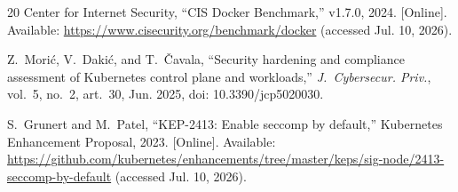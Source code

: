 \documentclass[conference]{IEEEtran}
\begin{document}
\begin{thebibliography}{20}
Center for Internet Security, ``CIS Docker Benchmark,'' v1.7.0, 2024. [Online]. Available: \url{https://www.cisecurity.org/benchmark/docker} (accessed Jul. 10, 2026).

Z.~Morić, V.~Dakić, and T.~Čavala, ``Security hardening and compliance assessment of Kubernetes control plane and workloads,'' \emph{J.~Cybersecur. Priv.}, vol.~5, no.~2, art.~30, Jun. 2025, doi: 10.3390/jcp5020030.

S.~Grunert and M.~Patel, ``KEP-2413: Enable seccomp by default,'' Kubernetes Enhancement Proposal, 2023. [Online]. Available: \url{https://github.com/kubernetes/enhancements/tree/master/keps/sig-node/2413-seccomp-by-default} (accessed Jul. 10, 2026).

\end{thebibliography}
\end{document}
